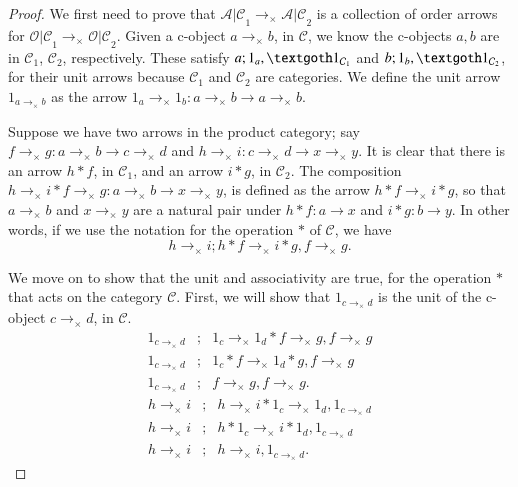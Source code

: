 \documentclass [12pt]{book}
\begin{document}
\begin{proof}We first need to prove that $\mathcal{A|C}_1\rightarrow_\times\mathcal{A|C}_2$ is a collection of order arrows for $\mathcal{O|C}_1\rightarrow_\times\mathcal{O|C}_2$. Given a c-object $a\rightarrow_\times b$, in $\mathcal C$, we know the c-objects $a,b$ are in $\mathcal C_1$, $\mathcal C_2$, respectively. These satisfy $a;1_a,\textgoth1_{\mathcal C_1}$ and $b;1_b,\textgoth1_{\mathcal C_2}$, for their unit arrows because $\mathcal C_1$ and $\mathcal C_2$ are categories. We define the unit arrow $1_{a\rightarrow_\times b}$ as the arrow $1_a\rightarrow_\times1_b:a\rightarrow_\times b\longrightarrow a\rightarrow_\times b$.

Suppose we have two arrows in the product category; say $f\rightarrow_\times g:a\rightarrow_\times b\longrightarrow c\rightarrow_\times d$ and $h\rightarrow_\times i:c\rightarrow_\times d\longrightarrow x\rightarrow_\times y$. It is clear that there is an arrow $h*f$, in $\mathcal C_1$, and an arrow $i*g$, in $\mathcal C_2$. The composition $h\rightarrow_\times i*f\rightarrow_\times g:a\rightarrow_\times b\longrightarrow x\rightarrow_\times y$, is defined as the arrow $h*f\rightarrow_\times i*g$, so that $a\rightarrow_\times b$ and $x\rightarrow_\times y$ are a natural pair under $h*f:a\rightarrow x$ and $i*g:b\rightarrow y$. In other words, if we use the notation for the operation $*$ of $\mathcal C$, we have \begin{equation}h\rightarrow_\times i;h*f\rightarrow_\times i*g,f\rightarrow_\times g.\label{def prod cat}\end{equation}

We move on to show that the unit and associativity are true, for the operation $*$  that acts on the category $\mathcal C$. First, we will show that $1_{c\rightarrow_\times d}$ is the unit of the c-object $c\rightarrow_\times d$, in $\mathcal C$. \begin{eqnarray}\nonumber1_{c\rightarrow_\times d}&;&1_c\rightarrow_\times1_d*f\rightarrow_\times g,f\rightarrow_\times g\\\nonumber1_{c\rightarrow_\times d}&;&1_c*f\rightarrow_\times 1_d*g,f\rightarrow_\times g\\\nonumber1_{c\rightarrow_\times d}&;&f\rightarrow_\times g,f\rightarrow_\times g.\end{eqnarray} \begin{eqnarray}h\rightarrow_\times i&;&h\rightarrow_\times i*1_c\rightarrow_\times1_d,\nonumber1_{c\rightarrow_\times d}\\\nonumber h\rightarrow_\times i&;&h*1_c\rightarrow_\times i*1_d,1_{c\rightarrow_\times d}\\\nonumber h\rightarrow_\times i&;&h\rightarrow_\times i,1_{c\rightarrow_\times d}.\end{eqnarray}


\end{proof}
\end{document}

